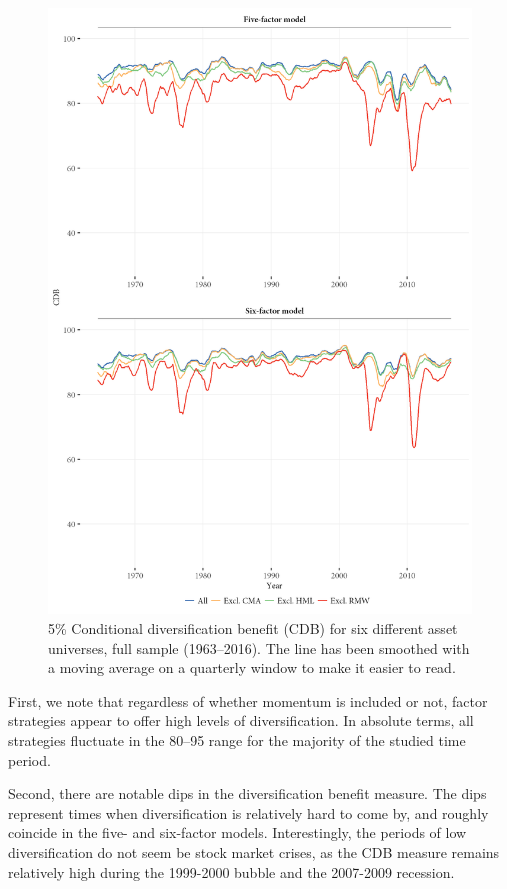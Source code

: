 \begin{figure}
  \centering
  \footnotesize
  \renewcommand{\arraystretch}{1.2}
  \caption{5\% Conditional diversification benefit (CDB) for six different asset universes, full sample (1963--2016). 
  The line has been smoothed with a moving average on a quarterly window to make it easier to read.}
  \label{fig:cdb}
  \includegraphics[scale = 1]{graphics/cdb/CDB.png}
\end{figure}

First, we note that regardless of whether momentum is included or not, factor strategies appear to offer high levels of diversification. In absolute terms, all strategies fluctuate in the 80--95 range for the majority of the studied time period. 

Second, there are notable dips in the diversification benefit measure. The dips represent times when diversification is relatively hard to come by, and roughly coincide in the five- and six-factor models. Interestingly, the periods of low diversification do not seem be stock market crises, as the CDB measure remains relatively high during the 1999-2000 bubble and the 2007-2009 recession.

